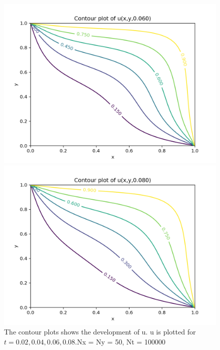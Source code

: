 \documentclass{article}
\begin{document}
\begin{figure}[!tbp]
\begin{minipage}[b]{0.45\textwidth}
    \includegraphics[width=\textwidth]{contour3.png}
  \end{minipage}
  \hfill
  \begin{minipage}[b]{0.45\textwidth}
    \includegraphics[width=\textwidth]{contour4.png}
  \end{minipage}
  \caption{The contour plots shows the development of u. u is plotted for $t=0.02,0.04,0.06, 0.08$.Nx = Ny = 50, Nt = 100000}
  \label{fig:contours}
\end{figure} 
\end{document}
